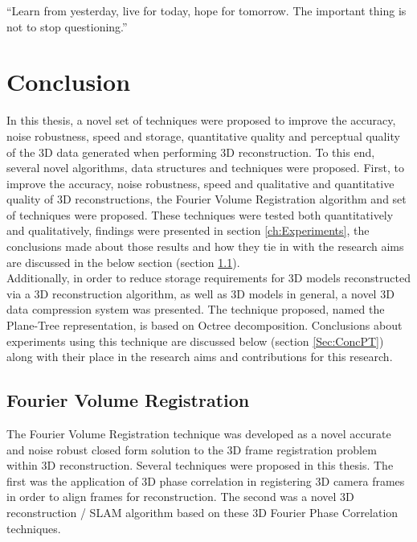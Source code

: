 \begin{savequote}[8cm]
  ``Learn from yesterday, live for today, hope for tomorrow. The important thing is not to stop questioning.''
\end{savequote}
\makeatletter
\chapter{Conclusion}

In this thesis, a novel set of techniques were proposed to improve the accuracy, noise robustness, speed and storage, quantitative quality and perceptual quality of the 3D data generated when performing 3D reconstruction. To this end, several novel algorithms, data structures and techniques were proposed. First, to improve the accuracy, noise robustness, speed and qualitative and quantitative quality of 3D reconstructions, the Fourier Volume Registration algorithm and set of techniques were proposed. These techniques were tested both quantitatively and qualitatively, findings were presented in section \ref{ch:Experiments}, the conclusions made about those results and how they tie in with the research aims are discussed in the below section (section \ref{Sec:ConcFVR}). \\

Additionally, in order to reduce storage requirements for 3D models reconstructed via a 3D reconstruction algorithm, as well as 3D models in general, a novel 3D data compression system was presented. The technique proposed, named the Plane-Tree representation, is based on Octree decomposition. Conclusions about experiments using this technique are discussed below (section \ref{Sec:ConcPT}) along with their place in the research aims and contributions for this research. \\

\section{Fourier Volume Registration}
\label{Sec:ConcFVR}

The Fourier Volume Registration technique was developed as a novel accurate and noise robust closed form solution to the 3D frame registration problem within 3D reconstruction. Several techniques were proposed in this thesis. The first was the application of 3D phase correlation in registering 3D camera frames in order to align frames for reconstruction. The second was a novel 3D reconstruction / SLAM algorithm based on these 3D Fourier Phase Correlation techniques. \\

